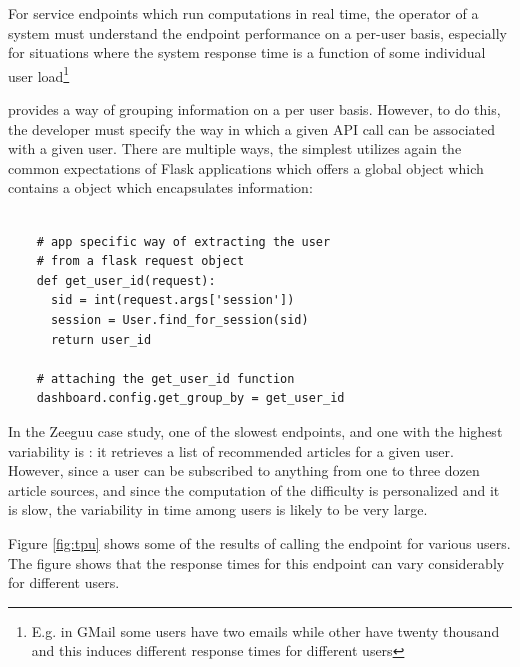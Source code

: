\documentclass[conference]{IEEEtran}
\begin{document}
  For service endpoints which run computations in real time, the operator of a system must understand the endpoint performance on a per-user basis, especially for situations where the system response time is a function of some individual user load\footnote{E.g. in GMail some users have two emails while other have twenty thousand and this induces different response times for different users}

  \tool provides a way of grouping information on a per user basis. However, to do this, the developer must specify the way in which a given API call can be associated with a given user. There are multiple ways, the simplest utilizes again the common expectations of Flask applications which offers a global  object which contains a  object which encapsulates information: 

  \begin{lstlisting}[float,caption=Simply define a custom app-specific function for user retrieval and pass it to the \tool to group information by user,style=custompython]
    
    # app specific way of extracting the user
    # from a flask request object    
    def get_user_id(request):
      sid = int(request.args['session'])
      session = User.find_for_session(sid)
      return user_id

    # attaching the get_user_id function
    dashboard.config.get_group_by = get_user_id

  \end{lstlisting}

  In the Zeeguu case study, one of the slowest endpoints, and one with the highest variability is \epFeedItems: it retrieves a list of recommended articles for a given user. However, since a user can be subscribed to anything from one to three dozen article sources, and since the computation of the difficulty is personalized and it is slow, the variability in time among users is likely to be very large. 


  Figure \ref{fig:tpu} shows some of the results of calling the \epFeedItems endpoint for various users. The figure shows that the response times for this endpoint can vary considerably for different users. 
\end{document}
